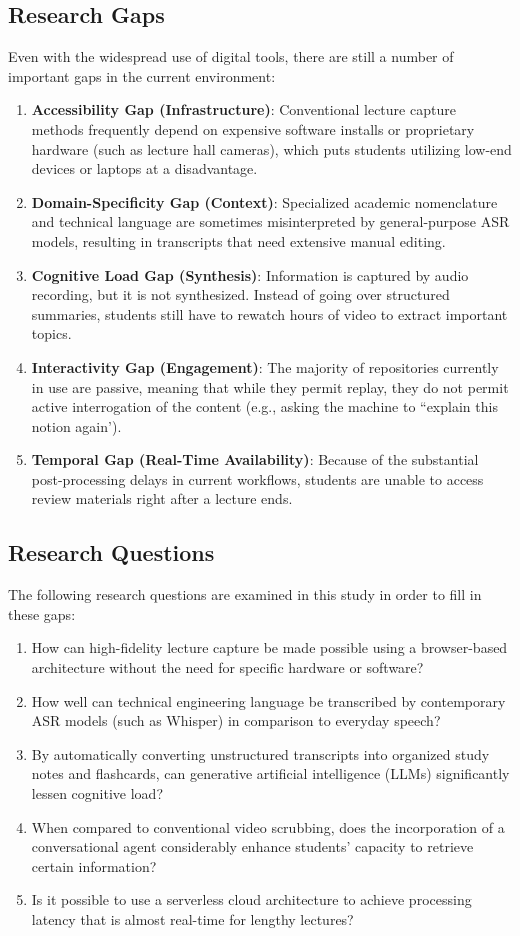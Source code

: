 \documentclass[runningheads]{llncs}
\begin{document}
\subsection{Research Gaps}
Even with the widespread use of digital tools, there are still a number of important gaps in the current environment:
\begin{enumerate}
    \item \textbf{Accessibility Gap (Infrastructure)}: Conventional lecture capture methods frequently depend on expensive software installs or proprietary hardware (such as lecture hall cameras), which puts students utilizing low-end devices or laptops at a disadvantage.
    \item \textbf{Domain-Specificity Gap (Context)}: Specialized academic nomenclature and technical language are sometimes misinterpreted by general-purpose ASR models, resulting in transcripts that need extensive manual editing.
    \item \textbf{Cognitive Load Gap (Synthesis)}: Information is captured by audio recording, but it is not synthesized. Instead of going over structured summaries, students still have to rewatch hours of video to extract important topics.
    \item \textbf{Interactivity Gap (Engagement)}: The majority of repositories currently in use are passive, meaning that while they permit replay, they do not permit active interrogation of the content (e.g., asking the machine to ``explain this notion again').
    \item \textbf{Temporal Gap (Real-Time Availability)}: Because of the substantial post-processing delays in current workflows, students are unable to access review materials right after a lecture ends.
\end{enumerate}

\subsection{Research Questions}
The following research questions are examined in this study in order to fill in these gaps:
\begin{enumerate}[label=\textbf{RQ\arabic*}]
    \item How can high-fidelity lecture capture be made possible using a browser-based architecture without the need for specific hardware or software?
    \item How well can technical engineering language be transcribed by contemporary ASR models (such as Whisper) in comparison to everyday speech?
    \item By automatically converting unstructured transcripts into organized study notes and flashcards, can generative artificial intelligence (LLMs) significantly lessen cognitive load?
    \item When compared to conventional video scrubbing, does the incorporation of a conversational agent considerably enhance students' capacity to retrieve certain information?
    \item Is it possible to use a serverless cloud architecture to achieve processing latency that is almost real-time for lengthy lectures?
\end{enumerate}
\end{document}
